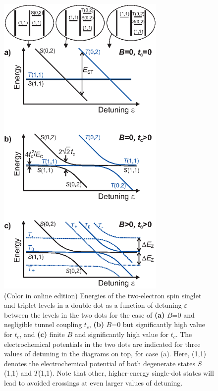 \documentclass[12pt,aps,nofootinbib]{revtex4-1}
\begin{document}
\begin{figure}[p]
\includegraphics[width=3.2in, clip=true]{hanson_fig32.eps}
\caption{(Color in online edition) Energies of the two-electron spin singlet and triplet
levels in a double dot as a function of detuning $\varepsilon$ between the
levels in the two dots for the case of \textbf{(a)} $B$=0 and
negligible tunnel coupling $t_c$, \textbf{(b)} $B$=0 but
significantly high value for $t_c$, and \textbf{(c)} finite $B$
and significantly high value for $t_c$. The electrochemical potentials in the two dots are indicated for three values of detuning in the diagrams on top, for case (a). Here, (1,1) denotes the electrochemical potential of both degenerate states $S$(1,1) and $T$(1,1). Note that other, higher-energy single-dot states will lead to avoided crossings at even larger values of detuning.}
\label{fig:DDSpinEnergies}
\end{figure}
\end{document}
